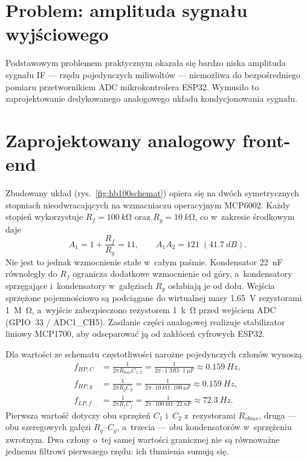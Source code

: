 \documentclass[12pt,a4paper,oneside]{report}
\begin{document}
\section{Problem: amplituda sygnału wyjściowego}
Podstawowym problemem praktycznym okazała się bardzo niska amplituda sygnału
IF --- rzędu pojedynczych miliwoltów --- niemożliwa do bezpośredniego pomiaru
przetwornikiem ADC mikrokontrolera ESP32. Wymusiło to zaprojektowanie
dedykowanego analogowego układu kondycjonowania sygnału.

\section{Zaprojektowany analogowy front-end}
\label{sec:frontend}

Zbudowany układ (rys.~\ref{fig:hb100schemat}) opiera się na dwóch
symetrycznych stopniach nieodwracających na wzmacniaczu operacyjnym MCP6002.
Każdy stopień wykorzystuje $R_f = \SI{100}{k\ohm}$ oraz
$R_g = \SI{10}{k\ohm}$, co w~zakresie środkowym daje
\begin{equation}
  A_1=1+\frac{R_f}{R_g}=11,
  \qquad A_{1}A_{2}=121\;(\SI{41.7}{dB}).
  \label{eq:hb100-gain}
\end{equation}
Nie jest to jednak wzmocnienie stałe w~całym paśmie. Kondensator
\SI{22}{nF} równoległy do $R_f$ ogranicza dodatkowe wzmocnienie od góry,
a~kondensatory sprzęgające i~kondensatory w~gałęziach $R_g$ osłabiają je od
dołu. Wejścia sprzężone pojemnościowo
są podciągane do wirtualnej masy \SI{1.65}{V} rezystorami \SI{1}{M\ohm},
a~wyjście zabezpieczono rezystorem \SI{1}{k\ohm} przed wejściem ADC
(GPIO~33 / ADC1\_CH5). Zasilanie części analogowej realizuje stabilizator
liniowy MCP1700, aby odseparować ją od zakłóceń cyfrowych ESP32.

Dla wartości ze schematu częstotliwości narożne pojedynczych członów wynoszą
\begin{align}
  f_{HP,C}&=\frac{1}{2\pi R_{bias}C_{1,2}}
  =\frac{1}{2\pi\cdot\SI{1}{M\ohm}\cdot\SI{1}{\micro F}}
  \approx\SI{0.159}{Hz}, \\
  f_{HP,g}&=\frac{1}{2\pi R_gC_g}
  =\frac{1}{2\pi\cdot\SI{10}{k\ohm}\cdot\SI{100}{\micro F}}
  \approx\SI{0.159}{Hz}, \\
  f_{LP,f}&=\frac{1}{2\pi R_fC_f}
  =\frac{1}{2\pi\cdot\SI{100}{k\ohm}\cdot\SI{22}{nF}}
  \approx\SI{72.3}{Hz}.
  \label{eq:hb100-corners}
\end{align}
Pierwsza wartość dotyczy obu sprzężeń $C_1$ i~$C_2$ z~rezystorami
$R_{vbias}$, druga --- obu szeregowych gałęzi $R_g$--$C_g$, a~trzecia ---
obu kondensatorów w~sprzężeniu zwrotnym. Dwa człony o~tej samej wartości
granicznej nie są równoważne jednemu filtrowi pierwszego rzędu: ich tłumienia
sumują się.
\end{document}

